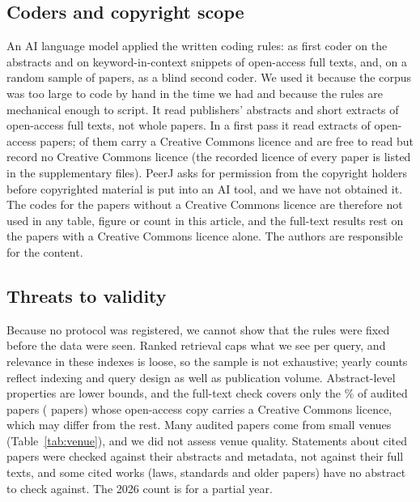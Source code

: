 \documentclass[preprint,12pt]{elsarticle}
\begin{document}
\subsection{Coders and copyright scope}\label{sec:ai}
An AI language model applied the written coding rules: as first coder on the abstracts and on keyword-in-context snippets of open-access full texts, and, on a random sample of \agNAll{} papers, as a blind second coder. We used it because the corpus was too large to code by hand in the time we had and because the rules are mechanical enough to script. It read publishers' abstracts and short extracts of open-access full texts, not whole papers. In a first pass it read extracts of \ftAllN{} open-access papers; \ftLicCC{} of them carry a Creative Commons licence and \ftLicNone{} are free to read but record no Creative Commons licence (the recorded licence of every paper is listed in the supplementary files). PeerJ asks for permission from the copyright holders before copyrighted material is put into an AI tool, and we have not obtained it. The codes for the \ftLicNone{} papers without a Creative Commons licence are therefore not used in any table, figure or count in this article, and the full-text results rest on the \ftLicCC{} papers with a Creative Commons licence alone. The authors are responsible for the content. \humanThreat{}

\subsection{Threats to validity}
Because no protocol was registered, we cannot show that the rules were fixed before the data were seen. Ranked retrieval caps what we see per query, and relevance in these indexes is loose, so the sample is not exhaustive; yearly counts reflect indexing and query design as well as publication volume. \srcThreat{} Abstract-level properties are lower bounds, and the full-text check covers only the \ftCcPct\% of audited papers (\ftN{} papers) whose open-access copy carries a Creative Commons licence, which may differ from the rest. Many audited papers come from small venues (Table~\ref{tab:venue}), and we did not assess venue quality. Statements about cited papers were checked against their abstracts and metadata, not against their full texts, and some cited works (laws, standards and older papers) have no abstract to check against. \humanThreat{} The 2026 count is for a partial year.

\end{document}
